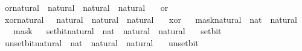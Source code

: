 \begin{isabellebody}
%
\endisatagproof
{\isafoldproof}%
%
\isadelimproof
%
\endisadelimproof
\isanewline
\isanewline
{}\isamarkupfalse%
\ or{\isacharunderscore}{\kern0pt}natural\ {\isacharcolon}{\kern0pt}{\isacharcolon}{\kern0pt}\ {\isacartoucheopen}natural\ {\isasymRightarrow}\ natural\ {\isasymRightarrow}\ natural{\isacartoucheclose}\isanewline
\ \ \ or%
\isadelimproof
\ %
\endisadelimproof
%
\isatagproof
\isacommand{{\isachardot}{\kern0pt}}\isamarkupfalse%
%
\endisatagproof
{\isafoldproof}%
%
\isadelimproof
%
\endisadelimproof
\isanewline
\isanewline
{}\isamarkupfalse%
\ xor{\isacharunderscore}{\kern0pt}natural\ {\isacharcolon}{\kern0pt}{\isacharcolon}{\kern0pt}\ \ {\isacartoucheopen}natural\ {\isasymRightarrow}\ natural\ {\isasymRightarrow}\ natural{\isacartoucheclose}\isanewline
\ \ \ xor%
\isadelimproof
\ %
\endisadelimproof
%
\isatagproof
\isacommand{{\isachardot}{\kern0pt}}\isamarkupfalse%
%
\endisatagproof
{\isafoldproof}%
%
\isadelimproof
%
\endisadelimproof
\isanewline
\isanewline
{}\isamarkupfalse%
\ mask{\isacharunderscore}{\kern0pt}natural\ {\isacharcolon}{\kern0pt}{\isacharcolon}{\kern0pt}\ {\isacartoucheopen}nat\ {\isasymRightarrow}\ natural{\isacartoucheclose}\isanewline
\ \ \ mask%
\isadelimproof
\ %
\endisadelimproof
%
\isatagproof
\isacommand{{\isachardot}{\kern0pt}}\isamarkupfalse%
%
\endisatagproof
{\isafoldproof}%
%
\isadelimproof
%
\endisadelimproof
\isanewline
\isanewline
{}\isamarkupfalse%
\ set{\isacharunderscore}{\kern0pt}bit{\isacharunderscore}{\kern0pt}natural\ {\isacharcolon}{\kern0pt}{\isacharcolon}{\kern0pt}\ {\isacartoucheopen}nat\ {\isasymRightarrow}\ natural\ {\isasymRightarrow}\ natural{\isacartoucheclose}\isanewline
\ \ \ set{\isacharunderscore}{\kern0pt}bit%
\isadelimproof
\ %
\endisadelimproof
%
\isatagproof
\isacommand{{\isachardot}{\kern0pt}}\isamarkupfalse%
%
\endisatagproof
{\isafoldproof}%
%
\isadelimproof
%
\endisadelimproof
\isanewline
\isanewline
{}\isamarkupfalse%
\ unset{\isacharunderscore}{\kern0pt}bit{\isacharunderscore}{\kern0pt}natural\ {\isacharcolon}{\kern0pt}{\isacharcolon}{\kern0pt}\ {\isacartoucheopen}nat\ {\isasymRightarrow}\ natural\ {\isasymRightarrow}\ natural{\isacartoucheclose}\isanewline
\ \ \ unset{\isacharunderscore}{\kern0pt}bit%
\isadelimproof
\ %
\endisadelimproof

\end{isabellebody}
